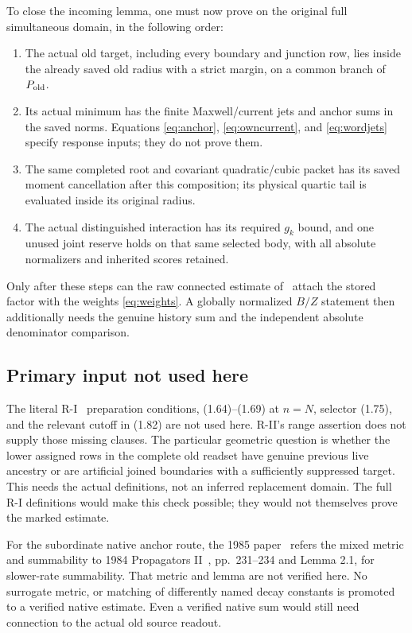\documentclass[11pt,letterpaper]{article}
\theoremstyle{plain}
\theoremstyle{remark}\newtheorem{remark}[theorem]{Scope}
\begin{document}
To close the incoming lemma, one must now prove on the original full
simultaneous domain, in the following order:
\begin{enumerate}
\item The actual old target, including every boundary and junction row,
lies inside the already saved old radius with a strict margin, on a common
branch of $P_{\rm old}$.
\item Its actual minimum has the finite Maxwell/current jets and anchor
sums in the saved norms. Equations \eqref{eq:anchor}, \eqref{eq:owncurrent},
and \eqref{eq:wordjets} specify response inputs; they do not prove them.
\item The same completed root and covariant quadratic/cubic packet has
its saved moment cancellation after this composition; its physical
quartic tail is evaluated inside its original radius.
\item The actual distinguished interaction has its required $g_k$ bound,
and one unused joint reserve holds on that same selected body, with all
absolute normalizers and inherited scores retained.
\end{enumerate}
Only after these steps can the raw connected estimate of~\cite[\S3]{CE} attach the
stored factor with the weights \eqref{eq:weights}. A globally normalized
$B/Z$ statement then additionally needs the genuine history sum and the
independent absolute denominator comparison.

\subsection{Primary input not used here}

The literal R-I~\cite{ri} preparation conditions, (1.64)--(1.69) at
$n=N$, selector (1.75), and the relevant cutoff in (1.82) are not
used here. R-II's range assertion does not supply
those missing clauses. The particular geometric question is whether the
lower assigned rows in the complete old readset have genuine previous
live ancestry or are artificial joined boundaries with a sufficiently
suppressed target. This needs the actual definitions, not an inferred
replacement domain. The full R-I definitions would make this check
possible; they would not themselves prove the marked estimate.

For the subordinate native anchor route, the 1985 paper~\cite{var85}
refers the mixed metric and summability to
1984 Propagators II~\cite{prop84}, pp.\ 231--234 and Lemma 2.1, for
slower-rate summability. That metric and lemma are not verified here. No
surrogate metric, or matching of differently named decay constants is
promoted to a verified native estimate. Even a verified native sum would
still need connection to the actual old source readout.
\end{document}
